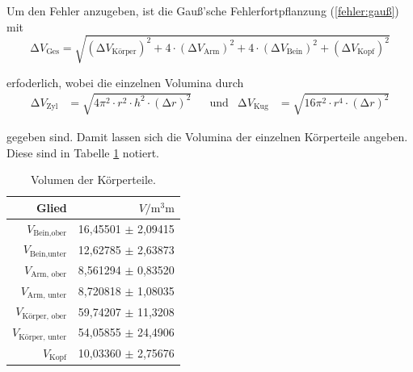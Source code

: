 Um den Fehler anzugeben, ist die Gauß'sche Fehlerfortpflanzung (\ref{fehler:gauß}) mit
\begin{equation}
  \increment V_{\text{Ges}} = \sqrt{(\increment V_{\text{Körper}})^2 + 4 \cdot (\increment V_{\text{Arm}})^2 
    + 4 \cdot (\increment V_{\text{Bein}})^2 + (\increment V_{\text{Kopf}})^2}
\end{equation}

erfoderlich, wobei die einzelnen Volumina durch 
\begin{align*}
  \increment V_{\text{Zyl}} &= \sqrt{4 \pi^2 \cdot r^2 \cdot h^2 \cdot (\increment r)^2} & 
  &\text{und}& 
  \increment V_{\text{Kug}} &= \sqrt{16 \pi^2 \cdot r^4 \cdot (\increment r)^2}
\end{align*}

gegeben sind. Damit lassen sich die Volumina der einzelnen Körperteile angeben.
Diese sind in Tabelle \ref{tab:VolGlieder} notiert.



\begin{table}
  \centering
  \caption{Volumen der Körperteile.}
  \label{tab:VolGlieder}
  \begin{tabular}{rr}
  \toprule
  Glied & $V / \unit{\cubic\milli\meter}$ \\
  \midrule
  $V_{\text{Bein,ober}}$      & 16,45501 $\pm$ 2,09415 \\
  $V_{\text{Bein,unter}}$     & 12,62785 $\pm$ 2,63873 \\
  $V_{\text{Arm, ober}}$      & 8,561294 $\pm$ 0,83520 \\
  $V_{\text{Arm, unter}}$     & 8,720818 $\pm$ 1,08035 \\
  $V_{\text{Körper, ober}}$   & 59,74207 $\pm$ 11,3208 \\
  $V_{\text{Körper, unter}}$  & 54,05855 $\pm$ 24,4906 \\
  $V_{\text{Kopf}}$           & 10,03360 $\pm$ 2,75676 \\
  \bottomrule
\end{tabular}
\end{table}

